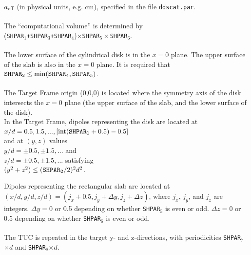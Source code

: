 	${a}_{\rm eff}$ (in physical units, e.g. cm), 
	specified in the file {\tt ddscat.par}.\\
	\ \\
	The ``computational volume'' is determined by\\
	({\tt SHPAR$_1$+SHPAR$_3$+SHPAR$_4$})$\times${\tt SHPAR}$_5\times${\tt SHPAR}$_6$.\\
	\ \\
	    The lower surface of the cylindrical disk is in the $x=0$ plane.
	    The upper surface of the slab is also in the $x=0$ plane.
	    It is required that 
            ${\tt SHPAR}_2\leq{\rm min}({\tt SHPAR}_4,{\tt SHPAR}_5)$.\\
	    \ \\
	    The Target Frame origin (0,0,0) is located where the symmetry
	    axis of the disk intersects the $x=0$ plane (the upper surface
	    of the slab, and the lower surface of the disk).\\
	    In the Target Frame, 
            dipoles representing the disk are located at\\
	     $x/d = 0.5 , 1.5 ,..., 
	    [{\rm int}({\tt SHPAR}_1+0.5)-0.5]$\\
	    and at $(y,z)$ values \\
	     $y/d = \pm 0.5, \pm 1.5, ...$ and\\
	     $z/d = \pm 0.5, \pm 1.5, ...$ satisfying\\
	     $(y^2+z^2) \leq ({\tt SHPAR}_2/2)^2 d^2$.
	    
	    Dipoles representing the rectangular slab
	    are located at
	    $(x/d,y/d,z/d)=(j_x+0.5,j_y+\Delta y,j_z+\Delta z)$, where
	    $j_x$, $j_y$, and $j_z$ are integers. $\Delta y=0$ or 0.5
	    depending on whether {\tt SHPAR}$_5$ is even or odd.
	    $\Delta z=0$ or 0.5 depending on whether {\tt SHPAR}$_6$ is
	    even or odd.\\
	    \ \\
	    The TUC 
	    is repeated in the target y- and z-directions, with 
	    periodicities {\tt SHPAR$_7$}$\times d$ and 
            {\tt SHPAR}$_8$$\times d$.


